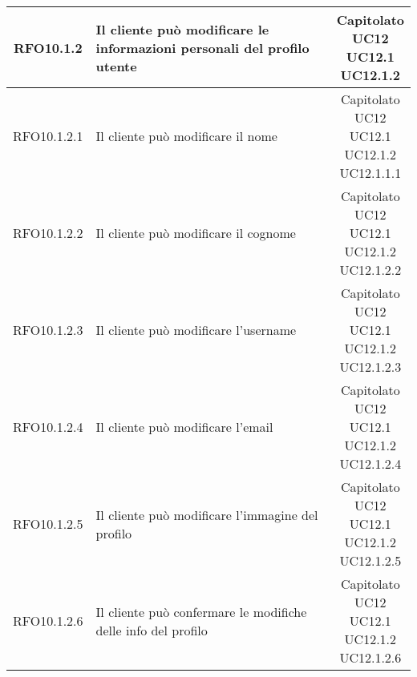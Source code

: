 \begin{longtable}{|c|p{8cm}|c|}
\hypertarget{RFO10.1.2}{RFO10.1.2} &  Il cliente può modificare le informazioni personali del profilo utente &\makecell*{Capitolato\\UC12\\UC12.1\\UC12.1.2} \\
\hline

\hypertarget{RFO10.1.2.1}{RFO10.1.2.1} &  Il cliente può modificare il nome & \makecell*{Capitolato\\UC12\\UC12.1\\UC12.1.2\\UC12.1.1.1} \\
\hline

\hypertarget{RFO10.1.2.2}{RFO10.1.2.2} &  Il cliente può modificare il cognome & \makecell*{Capitolato\\UC12\\UC12.1\\UC12.1.2\\UC12.1.2.2} \\
\hline

\hypertarget{RFO10.1.2.3}{RFO10.1.2.3} &  Il cliente può modificare l'username & \makecell*{Capitolato\\UC12\\UC12.1\\UC12.1.2\\UC12.1.2.3} \\
\hline

\hypertarget{RFO10.1.2.4}{RFO10.1.2.4} &  Il cliente può modificare l'email & \makecell*{Capitolato\\UC12\\UC12.1\\UC12.1.2\\UC12.1.2.4} \\
\hline

\hypertarget{RFO10.1.2.5}{RFO10.1.2.5} &  Il cliente può modificare l'immagine del profilo & \makecell*{Capitolato\\UC12\\UC12.1\\UC12.1.2\\UC12.1.2.5} \\
\hline

\hypertarget{RFO10.1.2.6}{RFO10.1.2.6} &  Il cliente può confermare le modifiche delle info del profilo & \makecell*{Capitolato\\UC12\\UC12.1\\UC12.1.2\\UC12.1.2.6} \\
\hline


\end{longtable}
